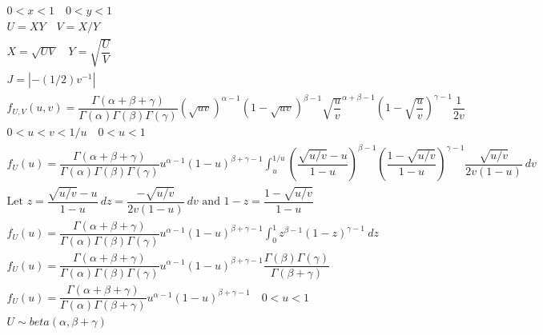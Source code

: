 \documentclass{article}
\begin{document}
\begin{flushleft}
\begin{enumerate}[(a)]
\begin{multline*}
0<x<1 \quad 0<y<1\\
U=XY \quad V=X/Y\\
X=\sqrt{UV} \quad Y=\sqrt{\dfrac{U}{V}}\\
J=|-(1/2)v^{-1}|\\
f_{U,V}(u,v)=\dfrac{\Gamma(\alpha+\beta+\gamma)}{\Gamma(\alpha)\Gamma(\beta)\Gamma(\gamma)}(\sqrt{uv})^{\alpha-1}(1-\sqrt{uv})^{\beta-1}{\sqrt{\dfrac{u}{v}}}^{\alpha+\beta-1}{\left(1-\sqrt{\dfrac{u}{v}}\right)}^{\gamma-1}\dfrac{1}{2v}\\
0<u<v<1/u \quad 0<u<1\\
f_U(u)=\dfrac{\Gamma(\alpha+\beta+\gamma)}{\Gamma(\alpha)\Gamma(\beta)\Gamma(\gamma)}u^{\alpha-1}(1-u)^{\beta+\gamma-1}\int_{u}^{1/u}\left(\dfrac{\sqrt{u/v}-u}{1-u}\right)^{\beta-1}\left(\dfrac{1-\sqrt{u/v}}{1-u}\right)^{\gamma-1}\dfrac{\sqrt{u/v}}{2v(1-u)} \ dv\\
\text{Let } z=\dfrac{\sqrt{u/v}-u}{1-u} \ dz=\dfrac{-\sqrt{u/v}}{2v(1-u)}\ dv \text{ and } 1-z=\dfrac{1-\sqrt{u/v}}{1-u}\\
f_U(u)=\dfrac{\Gamma(\alpha+\beta+\gamma)}{\Gamma(\alpha)\Gamma(\beta)\Gamma(\gamma)}u^{\alpha-1}(1-u)^{\beta+\gamma-1}\int_{0}^{1}z^{\beta-1}(1-z)^{\gamma-1} \ dz\\
f_U(u)=\dfrac{\Gamma(\alpha+\beta+\gamma)}{\Gamma(\alpha)\Gamma(\beta)\Gamma(\gamma)}u^{\alpha-1}(1-u)^{\beta+\gamma-1}\dfrac{\Gamma(\beta)\Gamma(\gamma)}{\Gamma(\beta+\gamma)}\\
f_U(u)=\dfrac{\Gamma(\alpha+\beta+\gamma)}{\Gamma(\alpha)\Gamma(\beta+\gamma)}u^{\alpha-1}(1-u)^{\beta+\gamma-1}\quad 0<u<1\\
U\sim beta(\alpha,\beta+\gamma)\\
\end{multline*}
\end{enumerate}

\end{flushleft}
\end{document}
